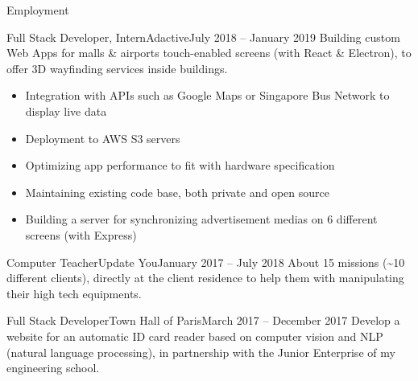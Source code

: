 \documentclass[]{mcdowellcv}
\begin{document}
    \makeheader

    \begin{cvsection}{Employment}
        \begin{cvsubsection}{Full Stack Developer, Intern}{Adactive}{July 2018 -- January 2019}
            Building custom Web Apps for malls \& airports touch-enabled screens (with React \& Electron), to offer 3D wayfinding services inside buildings.
            \begin{itemize}
                \item Integration with APIs such as Google Maps or Singapore Bus Network to display live data
                \item Deployment to AWS S3 servers
                \item Optimizing app performance to fit with hardware specification
                \item Maintaining existing code base, both private and open source
                \item Building a server for synchronizing advertisement medias on 6 different screens (with Express)
            \end{itemize}
        \end{cvsubsection}

        \begin{cvsubsection}{Computer Teacher}{Update You}{January 2017 -- July 2018}
            About 15 missions (\textasciitilde 10 different clients), directly at the client residence to help them with manipulating their high tech equipments.
        \end{cvsubsection}

        \begin{cvsubsection}{Full Stack Developer}{Town Hall of Paris}{March 2017 -- December 2017}
            Develop a website for an automatic ID card reader based on computer vision and NLP (natural language processing), in partnership with the Junior Enterprise of my engineering school.
        \end{cvsubsection}

    \end{cvsection}
\end{document}
